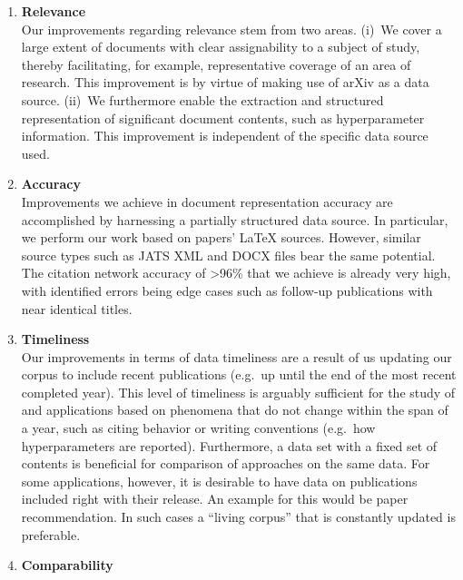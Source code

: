 \begin{enumerate}
\item \textbf{Relevance}\\
Our improvements regarding relevance stem from two areas. (i)~We cover a large extent of documents with clear assignability to a subject of study, thereby facilitating, for example, representative coverage of an area of research. This improvement is by virtue of making use of arXiv as a data source. (ii)~We furthermore enable the extraction and structured representation of significant document contents, such as hyperparameter information. This improvement is independent of the specific data source used.
\item \textbf{Accuracy}\\
Improvements we achieve in document representation accuracy are accomplished by harnessing a partially structured data source. In particular, we perform our work based on papers' \LaTeX{} sources. However, similar source types such as JATS XML and DOCX files bear the same potential. %
The citation network accuracy of >96\% that we achieve is already very high, with identified errors being edge cases such as follow-up publications with near identical titles. %
\item \textbf{Timeliness}\\
Our improvements in terms of data timeliness are a result of us updating our corpus to include recent publications (e.g.\ up until the end of the most recent completed year). This level of timeliness is arguably sufficient for the study of and applications based on phenomena that do not change within the span of a year, such as citing behavior or writing conventions (e.g.\ how hyperparameters are reported). Furthermore, a data set with a fixed set of contents is beneficial for comparison of approaches on the same data. For some applications, however, it is desirable to have data on publications included right with their release. An example for this would be paper recommendation. In such cases a ``living corpus'' that is constantly updated is preferable. %
\item \textbf{Comparability}\\

\end{enumerate}
